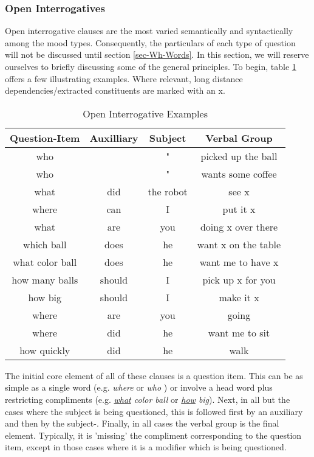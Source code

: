 \subsubsection{Open Interrogatives} \label{sec-Open-Interrogatives}

Open interrogative clauses are the most varied semantically and syntactically among the mood types. Consequently, the particulars of each type of question will not be discussed until section \ref{sec-Wh-Words}. In this section, we will reserve ourselves to briefly discussing some of the general principles. To begin, table \ref{tab-Open-Int} offers a few illustrating examples. Where relevant, long distance dependencies/extracted constituents are marked with an x.

\begin{table}[htdp]
\caption{Open Interrogative Examples}
\begin{center}
\begin{tabular}{|c|c|c|c|}
\hline
\textbf{Question-Item}&\textbf{Auxilliary}&\textbf{Subject} &\textbf{Verbal Group} \\ \hline
who & & " & picked up the ball \\ \hline
who & & " & wants some coffee \\ \hline
what & did & the robot & see x\\ \hline
where & can & I & put it x\\ \hline
what & are & you & doing x over there \\ \hline
which ball & does & he & want x on the table\\ \hline
what color ball & does & he & want me to have x\\ \hline
how many balls & should & I & pick up x for you \\ \hline
how big & should & I & make it x \\ \hline
where & are & you & going \\ \hline
where & did & he & want me to sit \\ \hline
how quickly & did & he & walk \\ \hline
\hline
\end{tabular}
\end{center}
\label{tab-Open-Int}
\end{table}%
The initial core element of all of these clauses is a question item. This can be as simple as a single word (e.g. \emph{where} or \emph{who} ) or involve a head word plus restricting compliments  (e.g. \emph{\underline{what} color ball} or \emph{\underline{how} big}). Next, in all but the cases where the subject is being questioned, this is followed first by an auxiliary and then by the subject-. Finally, in all cases the verbal group is the final element. Typically, it is 'missing' the compliment  corresponding to the question item, except in those cases where it is a modifier which is being questioned.
